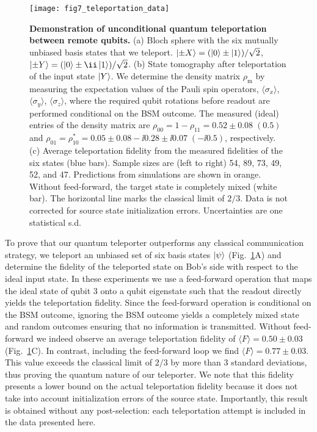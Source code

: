 \begin{figure*}
	\centering
    \texttt{[image: fig7\_teleportation\_data]}
    \caption {
    \label{fig:LDE-fig7} 
    \textbf{Demonstration of unconditional quantum teleportation between remote qubits.}
    (a) Bloch sphere with the six mutually unbiased basis states that we teleport. $\left|\pm X\right> = (\left|0\right> \pm \left|1\right>)/\sqrt2$, $\ket{\pm Y} = (\ket0 \pm \ii \ket1)/\sqrt2$.
    (b) State tomography after teleportation of the input state $\left|Y\right>$. We determine the density matrix $\rho_\mathrm m$ by measuring the expectation values of the Pauli spin operators, $\langle \sigma_x \rangle$, $\langle \sigma_y \rangle$, $\langle \sigma_z \rangle$, where the required qubit rotations before readout are performed conditional on the BSM outcome. The measured (ideal) entries of the density matrix are $\rho_{00} = 1 - \rho_{11} = 0.52 \pm 0.08 \; (0.5)$ and $\rho_{01} = \rho_{10}^* = 0.05 \pm 0.08 - \ii 0.28 \pm \ii 0.07\; (- \ii 0.5)$, respectively.
    (c) Average teleportation fidelity from the measured fidelities of the six states (blue bars). Sample sizes are (left to right) 54, 89, 73, 49, 52, and 47. Predictions from simulations are shown in orange. Without feed-forward, the target state is completely mixed (white bar). The horizontal line marks the classical limit of $2/3$. Data is not corrected for source state initialization errors. Uncertainties are one statistical s.d. 
    }
\end{figure*}
To prove that our quantum teleporter outperforms any classical communication strategy, we teleport an unbiased set of six basis states $\left|\psi\right>$ (Fig.~\ref{fig:LDE-fig7}A) and determine the fidelity of the teleported state on Bob's side with respect to the ideal input state. In these experiments we use a feed-forward operation that maps the ideal state of qubit 3 onto a qubit eigenstate such that the readout directly yields the teleportation fidelity. Since the feed-forward operation is conditional on the BSM outcome, ignoring the BSM outcome yields a completely mixed state and random outcomes ensuring that no information is transmitted. Without feed-forward we indeed observe an average teleportation fidelity of $\langle F \rangle = 0.50 \pm 0.03$ (Fig.~\ref{fig:LDE-fig7}C). In contrast, including the feed-forward loop we find $\langle F \rangle = 0.77 \pm 0.03$. This value exceeds the classical limit of $2/3$ by more than 3 standard deviations, thus proving the quantum nature of our teleporter. We note that this fidelity presents a lower bound on the actual teleportation fidelity because it does not take into account initialization errors of the source state. Importantly, this result is obtained without any post-selection: each teleportation attempt is included in the data presented here.

